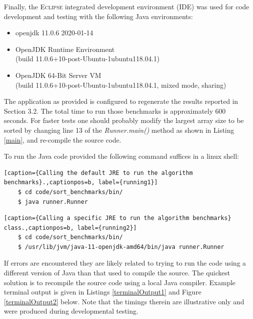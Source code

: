 \documentclass[12pt,a4paper]{article}
\begin{document}
Finally, the \textsc{Eclipse} integrated development environment (IDE) was used for code development and testing with the following Java environments: 
\begin{itemize}
\item openjdk 11.0.6 2020-01-14
\item  OpenJDK Runtime Environment \\(build 11.0.6+10-post-Ubuntu-1ubuntu118.04.1)
\item OpenJDK 64-Bit Server VM \\(build 11.0.6+10-post-Ubuntu-1ubuntu118.04.1, mixed mode, sharing)
\end{itemize}

The application as provided is configured to regenerate the results reported in Section 3.2. The total time to run those benchmarks is approximately 600 seconds. For faster tests one should probably modify the largest array size to be sorted by changing line 13 of the \emph{Runner.main()} method as shown in Listing \ref{main}, and re-compile the source code.

To run the Java code provided the following command suffices in a linux shell:

\begin{lstlisting}[caption={Calling the default JRE to run the algorithm benchmarks}.,captionpos=b, label={running1}]
	$ cd code/sort_benchmarks/bin/
	$ java runner.Runner
\end{lstlisting}

\begin{lstlisting}[caption={Calling a specific JRE to run the algorithm benchmarks} class.,captionpos=b, label={running2}]
	$ cd code/sort_benchmarks/bin/
	$ /usr/lib/jvm/java-11-openjdk-amd64/bin/java runner.Runner
\end{lstlisting}

If errors are encountered they are likely related to trying to run the code using a different version of Java than that used to compile the source. The quickest solution is to recompile the source code using a local Java compiler. Example terminal output is given in Listings \ref{terminalOutput1} and Figure \ref{terminalOutput2} below. Note that the timings therein are illustrative only and were produced during developmental testing.

\clearpage
\end{document}
